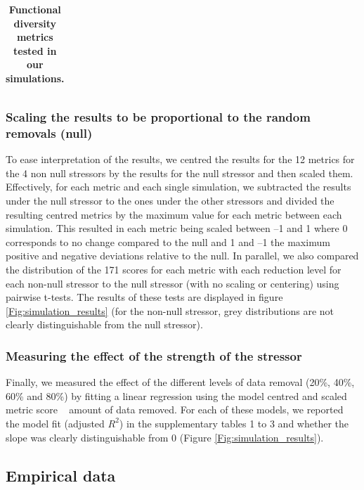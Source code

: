 \documentclass[12pt,letterpaper]{article}
\begin{document}
\begin{table}
\begin{tabular}{p{0.1\linewidth}|p{0.15\linewidth}|p{0.15\linewidth}|p{0.2\linewidth}|p{0.15\linewidth}|p{0.1\linewidth}}
\end{tabular}
\caption{\scriptsize{\textbf{Functional diversity metrics tested in our simulations.}}
}
\label{Tab:metrics}
\end{table}

\subsubsection{Scaling the results to be proportional to the random removals (null)}

To ease interpretation of the results, we centred the results for the 12 metrics for the 4 non null stressors by the results for the null stressor and then scaled them.
Effectively, for each metric and each single simulation, we subtracted the results under the null stressor to the ones under the other stressors and divided the resulting centred metrics by the maximum value for each metric between each simulation.
This resulted in each metric being scaled between –1 and 1 where 0 corresponds to no change compared to the null and 1 and –1 the maximum positive and negative deviations relative to the null.
In parallel, we also compared the distribution of the 171 scores for each metric with each reduction level for each non-null stressor to the null stressor (with no scaling or centering) using pairwise t-tests.
The results of these tests are displayed in figure \ref{Fig:simulation_results} (for the non-null stressor, grey distributions are not clearly distinguishable from the null stressor).

\subsubsection{Measuring the effect of the strength of the stressor}

Finally, we measured the effect of the different levels of data removal (20\%, 40\%, 60\% and 80\%) by fitting a linear regression using the model centred and scaled metric score ~ amount of data removed.
For each of these models, we reported the model fit (adjusted $R^2$) in the supplementary tables 1 to 3 and whether the slope was clearly distinguishable from 0 (Figure \ref{Fig:simulation_results}).

\subsection{Empirical data}
\end{document}
